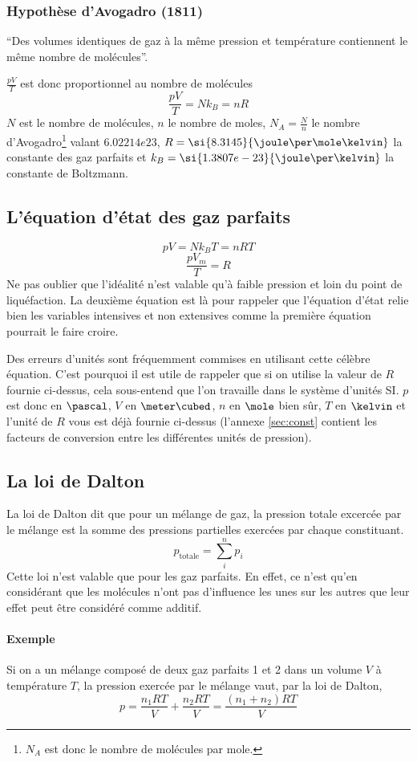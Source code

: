 \subsubsection{Hypothèse d'Avogadro (1811)}
``Des volumes identiques de gaz à la même pression et
température contiennent le même nombre de molécules''.

$\frac{pV}{T}$ est donc proportionnel au nombre de molécules
\[ \frac{pV}{T} = Nk_B = nR \]
$N$ est le nombre de molécules,
$n$ le nombre de moles,
$N_A = \frac{N}{n}$ le nombre d'Avogadro\footnote{$N_A$ est donc le nombre de molécules par mole.} valant $\si{6.02214e23}{}$,
$R = \si{8.3145}{\joule\per\mole\kelvin}$ la constante des gaz parfaits et
$k_B = \si{1.3807e-23}{\joule\per\kelvin}$ la constante de Boltzmann.

\subsection{L'équation d'état des gaz parfaits}
\[ pV = Nk_BT = nRT \]
\[ \frac{pV_m}{T} = R \]
Ne pas oublier que l'idéalité n'est valable qu'à faible pression et
loin du point de liquéfaction.
La deuxième équation est là pour rappeler que l'équation d'état relie bien
les variables intensives et non extensives comme la première équation pourrait
le faire croire.

Des erreurs d'unités sont fréquemment commises en utilisant cette célèbre équation. C'est pourquoi il est utile de rappeler que si on utilise la valeur de $R$ fournie ci-dessus, cela sous-entend que l'on travaille dans le système d'unités SI. $p$ est donc en $\pascal$, $V$ en $\meter\cubed$, $n$ en $\mole$ bien sûr, $T$ en $\kelvin$ et l'unité de $R$ vous est déjà fournie ci-dessus (l'annexe \ref{sec:const} contient les facteurs de conversion entre les différentes unités de pression).

\subsection{La loi de Dalton}
La loi de Dalton dit que pour un mélange de gaz, la pression totale
excercée par le mélange est la somme des pressions partielles exercées
par chaque constituant.
\[ p_\mathrm{totale} = \sum_i^n p_i \]
Cette loi n'est valable que pour les gaz parfaits.
En effet, ce n'est qu'en considérant que les molécules n'ont pas d'influence
les unes sur les autres que leur effet peut être considéré comme additif.
\paragraph{Exemple}
Si on a un mélange composé de deux gaz parfaits 1 et 2
dans un volume $V$ à température $T$,
la pression exercée par le mélange vaut, par la loi de Dalton,
\[ p = \frac{n_1 R T}{V} + \frac{n_2 R T}{V} = \frac{(n_1 + n_2) R T}{V} \]

